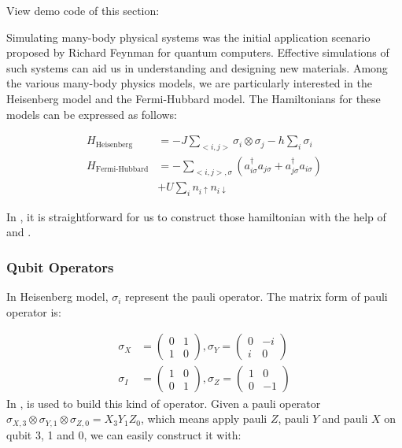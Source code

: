 View demo code of this section: 

Simulating many-body physical systems was the initial application scenario proposed by Richard Feynman for quantum computers. Effective simulations of such systems can aid us in understanding and designing new materials. Among the various many-body physics models, we are particularly interested in the Heisenberg model and the Fermi-Hubbard model. The Hamiltonians for these models can be expressed as follows:

\begin{align*}
    H_\text{Heisenberg}    & = -J\sum_{<i,j>}\sigma_i\otimes \sigma_j-h\sum_i\sigma_i                                             \\
    H_\text{Fermi-Hubbard} & = -\sum_{<i,j>,\sigma}\left(a_{i\sigma}^\dagger a_{j\sigma} + a_{j\sigma}^\dagger a_{i\sigma}\right) \\
                           & + U\sum_i n_{i\uparrow}n_{i\downarrow}
\end{align*}

In \MindQuantum, it is straightforward for us to construct those hamiltonian with the help of \QubitOperator and \FermionOperator.

\subsubsection{Qubit Operators}

In Heisenberg model, $\sigma_i$ represent the pauli operator. The matrix form of pauli operator is:

\begin{align*}
    \sigma_X & = \begin{pmatrix}
        0 & 1 \\
        1 & 0
    \end{pmatrix}, \sigma_Y = \begin{pmatrix}
        0 & -i \\
        i & 0
    \end{pmatrix} \\
    \sigma_I & =\begin{pmatrix}
        1 & 0 \\
        0 & 1
    \end{pmatrix}, \sigma_Z = \begin{pmatrix}
        1 & 0  \\
        0 & -1
    \end{pmatrix}
\end{align*}
In \MindQuantum, \QubitOperator is used to build this kind of operator. Given a pauli operator $\sigma_{X,3}\otimes \sigma_{Y,1}\otimes \sigma_{Z,0}=X_3 Y_1 Z_0$, which means apply pauli $Z$, pauli $Y$ and pauli $X$ on qubit 3, 1 and 0,  we can easily construct it with:

